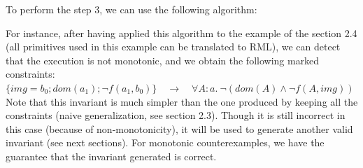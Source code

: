 \documentclass[11pt,a4paper,oldfontcommands,openany]{memoir}
\begin{document}
    To perform the step 3, we can use the following algorithm:

    \begin{algorithm}[H]
    \end{algorithm}\hfill

    For instance, after having applied this algorithm to the example of the section 2.4 (all primitives used in this example can be translated to RML),
    we can detect that the execution is not monotonic, and we obtain the following marked constraints:\\
    \(\{img=b_0 ; dom(a_1) ; \neg f(a_1,b_0)\} \quad \longrightarrow \quad \forall A:a.\ \neg (dom(A) \land \neg f(A,img))\)\\
    Note that this invariant is much simpler than the one produced by keeping all the constraints (naive generalization, see section 2.3).
    Though it is still incorrect in this case (because of non-monotonicity), it will be used to generate another valid invariant (see next sections).
    For monotonic counterexamples, we have the guarantee that the invariant generated is correct.\\
\end{document}
